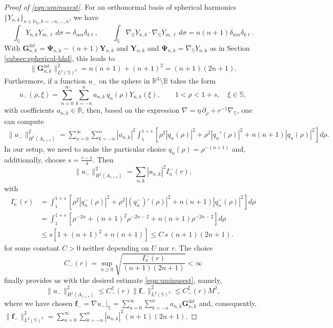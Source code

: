 \documentclass[a4paper, 11pt]{article}
\renewcommand{\SS}{\mathbb{S}}
\newcommand{\BB}{\mathbb{B}}
\newcommand{\R}{\mathbb{R}}
\newcommand{\f}{\mathbf{f}}
\begin{document}
\begin{proof}[Proof of \eqref{eqn:uminusest}]

    For an orthonormal basis of spherical harmonics $\{Y_{n,k}\}_{n\in\mathbb{N}_0,k=-n,\ldots,n}$, we have
	\[
		\int_{\SS}Y_{n,k}\overline{Y_{m,\ell}}\,d\sigma=\delta_{nm}\delta_{k\ell},
		\qquad
		\int_{\SS}\nabla_{\SS}Y_{n,k}\cdot\overline{\nabla_{\SS}Y_{m,\ell}}\,d\sigma
		=n(n+1)\delta_{nm}\delta_{k\ell}.
	\]
    With $\mathbf G_{n,k}^{\mathrm{int}}=\mathbf\Psi_{n,k}-(n+1)\mathbf Y_{n,k}$ and $\mathbf Y_{n,k}$ and $\mathbf\Psi_{n,k}=\nabla_{\SS}Y_{n,k}$ as in Section \ref{subsec:spherical-hhd}, this leads to
	\[
		\|\mathbf G_{n,k}^{\mathrm{int}}\|_{L^2(\SS)^3}^2
		= n(n+1)+(n+1)^2 =(n+1)(2n+1).
	\]
	Furthermore, if a function $u_-$ on the sphere in $\R^3\setminus \BB$ takes the form
	\[
		u_-(\rho,\xi)=\sum_{n=0}^\infty\sum_{k=-n}^n a_{n,k}\,q_n(\rho)Y_{n,k}(\xi),
		\qquad 1<\rho<1+s,\quad \xi\in\SS,
	\]
	with coefficients $a_{n,k}\in\R$, then, based on the expression $\nabla = \eta\,\partial_\rho + r^{-1}\nabla_\SS$, one can compute	\begin{align}
		\|u_-\|_{H^1(A_{1+s})}^2
		=
		\sum_{n=0}^\infty\sum_{k=-n}^n|a_{n,k}|^2
		\int_1^{1+s}
		\left[
			\rho^2|q_n(\rho)|^2
			+\rho^2|q_n'(\rho)|^2
			+n(n+1)|q_n(\rho)|^2
		\right]d\rho. \label{eqn:app-H1-shell-identity}
	\end{align}
    In our setup, we need to make the particular choice $q_n(\rho)=\rho^{-(n+1)}$ and, additionally, choose $s=\tfrac{r-1}{4}$. Then
	\[
		\|u_-\|_{H^1(A_{1+s})}^2
		=
		\sum_{n,k}|a_{n,k}|^2 I_n^-(r),
	\]
	with
	\begin{align*}
		I_n^-(r)
		&=
		\int_1^{1+s}
		\left[
			\rho^2|q_n^-(\rho)|^2
			+\rho^2|(q_n^-)'(\rho)|^2
			+n(n+1)|q_n^-(\rho)|^2
		\right]d\rho  \\
		&=
		\int_1^{1+s}
		\left[
			\rho^{-2n}
			+(n+1)^2\rho^{-2n-2}
			+n(n+1)\rho^{-2n-2}
		\right]d\rho
		\\&\le
		s\left[1+(n+1)^2+n(n+1)\right]
		\le
		C\,s\,(n+1)(2n+1).
	\end{align*}
	for some constant $C>0$ neither depending on $U$ nor $r$. The choice
	\[
		C_-(r)=\sup_{n\ge0}
		\sqrt{\frac{I_n^-(r)}{(n+1)(2n+1)}}
		<\infty
	\]
    finally provides us with the desired estimate \eqref{eqn:uminusest}, namely,
    \[
		\|u_-\|_{H^1(A_{1+s})}^2
		\le
		C_-^2(r)\|\f_-\|_{L^2(\SS)^3}^2\leq C_-^2(r)M^2,
	\]
    where we have chosen $\f_-=\nabla u_-|_{\SS}=\sum_{n=0}^\infty\sum_{k=-n}^na_{n,k}\mathbf G_{n,k}^{\mathrm{int}}$ and, consequently, $\|\f_-\|_{L^2(\SS)^3}^2=\sum_{n=0}^\infty\sum_{k=-n}^n|a_{n,k}|^2(n+1)(2n+1)$. 

\end{proof}
\end{document}
